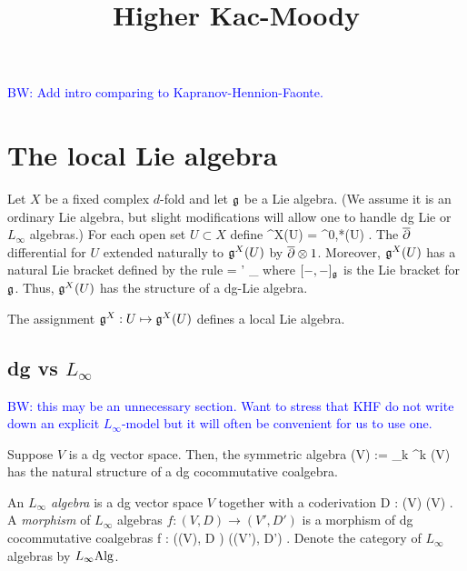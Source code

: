 \documentclass[10pt]{amsart}
\title{Higher Kac-Moody}
\def\brian{\textcolor{blue}{BW: }\textcolor{blue}}
\begin{document}
\maketitle

\brian{Add intro comparing to Kapranov-Hennion-Faonte.}

\section{The local Lie algebra}

Let $X$ be a fixed complex $d$-fold and let $\mathfrak g$ be a Lie algebra. (We assume it is an ordinary Lie algebra, but slight modifications will allow one to handle dg Lie or $L_\infty$ algebras.) For each open set $U \subset X$ define
\ben
\fg^X(U) = \Omega^{0,*}(U) \tensor \fg .
\een
The $\overline{\partial}$ differential for $U$ extended naturally to $\mathfrak g^X(U)$ by $\overline{\partial} \otimes 1$. Moreover, $\mathfrak g^X(U)$ has a natural Lie bracket defined by the rule
 = \omega \wedge \omega' \tensor [X,X']_\fg
\een
where $[-,-]_\mathfrak g$ is the Lie bracket for $\mathfrak g$. Thus, $\mathfrak g^X(U)$ has the structure of a dg-Lie algebra. 

\begin{lem} The assignment $\mathfrak g^X : U \mapsto \mathfrak g^X(U)$ defines a local Lie algebra. 
\end{lem}

\subsection{dg vs $L_\infty$}

\brian{this may be an unnecessary section. Want to stress that KHF do not write down an explicit $L_\infty$-model but it will often be convenient for us to use one.}

Suppose $V$ is a dg vector space. Then, the symmetric algebra 
\ben
\Sym(V) := \prod_{k} \Sym^{k} (V)
\een
has the natural structure of a dg cocommutative coalgebra.

\def\L8{L_\infty}
\def\Lcat{L_\infty{\rm Alg}}

\begin{dfn} An {\em $L_\infty$ algebra} is a dg vector space $V$ together with a coderivation
\ben
D : \Sym(V) \to \Sym(V) .
\een
A {\em morphism} of $L_\infty$ algebras $f : (V,D) \to (V',D')$ is a morphism of dg cocommutative coalgebras
\ben
f : \left(\Sym(V), D \right) \to \left(\Sym(V'), D'\right) .
\een
Denote the category of $L_\infty$ algebras by $\Lcat$. 
\end{dfn}
\end{document}
